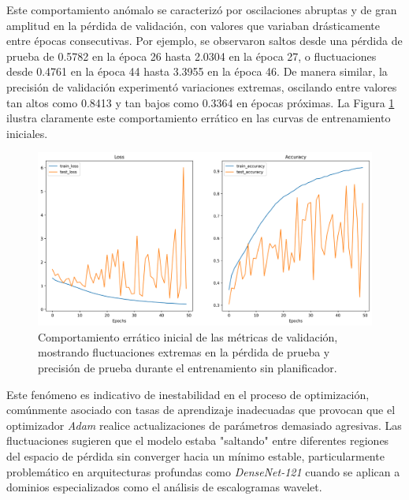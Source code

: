\vspace{5mm}

Este comportamiento anómalo se caracterizó por oscilaciones abruptas y de gran amplitud en la pérdida de validación, con valores que variaban drásticamente entre épocas consecutivas. Por ejemplo, se observaron saltos desde una pérdida de prueba de 0.5782 en la época 26 hasta 2.0304 en la época 27, o fluctuaciones desde 0.4761 en la época 44 hasta 3.3955 en la época 46. De manera similar, la precisión de validación experimentó variaciones extremas, oscilando entre valores tan altos como 0.8413 y tan bajos como 0.3364 en épocas próximas. La Figura \ref{fig:wavelet_experiment_failed_results} ilustra claramente este comportamiento errático en las curvas de entrenamiento iniciales.

\begin{figure}[ht]
\centering
\includegraphics[width=\textwidth]{images/wavelet_experiment_failed_results.png}
\caption{Comportamiento errático inicial de las métricas de validación, mostrando fluctuaciones extremas en la pérdida de prueba y precisión de prueba durante el entrenamiento sin planificador.}
\label{fig:wavelet_experiment_failed_results}
\end{figure}

\vspace{5mm}

Este fenómeno es indicativo de inestabilidad en el proceso de optimización, comúnmente asociado con tasas de aprendizaje inadecuadas que provocan que el optimizador \emph{Adam} realice actualizaciones de parámetros demasiado agresivas. Las fluctuaciones sugieren que el modelo estaba "saltando" entre diferentes regiones del espacio de pérdida sin converger hacia un mínimo estable, particularmente problemático en arquitecturas profundas como \emph{DenseNet-121} cuando se aplican a dominios especializados como el análisis de escalogramas wavelet.

